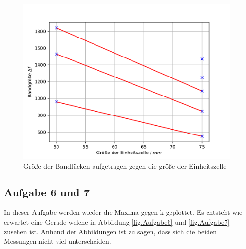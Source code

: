 \begin{figure}[h!]
  \centering
  \includegraphics[width=\textwidth]{newtest.pdf}
  \caption{Größe der Bandlücken aufgetragen gegen die größe der Einheitszelle}
  \label{fig.Aufgabe5a}
\end{figure}
\FloatBarrier

\subsection{Aufgabe 6 und 7}
In dieser Aufgabe werden wieder die Maxima gegen k geplottet. Es entsteht wie erwartet eine Gerade welche in Abbildung \ref{fig.Aufgabe6} und \ref{fig.Aufgabe7} zusehen ist.
Anhand der Abbildungen ist zu sagen, dass sich die beiden Messungen nicht viel unterscheiden.

